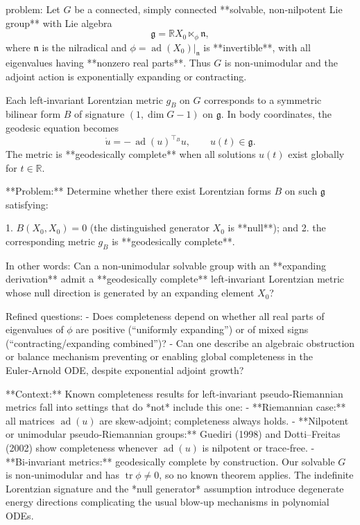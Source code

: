 problem:  
Let \(G\) be a connected, simply connected **solvable, non‑nilpotent Lie group** with Lie algebra  
\[
\mathfrak g = \mathbb R X_0 \ltimes_{\phi} \mathfrak n,
\]
where \(\mathfrak n\) is the nilradical and \(\phi=\operatorname{ad}(X_0)|_{\mathfrak n}\) is **invertible**, with all eigenvalues having **nonzero real parts**. Thus \(G\) is non‑unimodular and the adjoint action is exponentially expanding or contracting.  

Each left‑invariant Lorentzian metric \(g_B\) on \(G\) corresponds to a symmetric bilinear form \(B\) of signature \((1,\dim G-1)\) on \(\mathfrak g\). In body coordinates, the geodesic equation becomes  
\[
\dot u = -\,\operatorname{ad}(u)^{\top_B}u,\qquad u(t)\in\mathfrak g.
\]
The metric is **geodesically complete** when all solutions \(u(t)\) exist globally for \(t\in\mathbb R\).

**Problem:**  
Determine whether there exist Lorentzian forms \(B\) on such \(\mathfrak g\) satisfying:

1. \(B(X_0,X_0)=0\) (the distinguished generator \(X_0\) is **null**); and  
2. the corresponding metric \(g_B\) is **geodesically complete**.  

In other words:  
Can a non‑unimodular solvable group with an **expanding derivation** admit a **geodesically complete** left‑invariant Lorentzian metric whose null direction is generated by an expanding element \(X_0\)?  

Refined questions:  
- Does completeness depend on whether all real parts of eigenvalues of \(\phi\) are positive (“uniformly expanding”) or of mixed signs (“contracting/expanding combined”)?  
- Can one describe an algebraic obstruction or balance mechanism preventing or enabling global completeness in the Euler‑Arnold ODE, despite exponential adjoint growth?

**Context:**  
Known completeness results for left‑invariant pseudo‑Riemannian metrics fall into settings that do *not* include this one:  
- **Riemannian case:** all matrices \(\operatorname{ad}(u)\) are skew‑adjoint; completeness always holds.  
- **Nilpotent or unimodular pseudo‑Riemannian groups:** Guediri (1998) and Dotti–Freitas (2002) show completeness whenever \(\operatorname{ad}(u)\) is nilpotent or trace‑free.  
- **Bi‑invariant metrics:** geodesically complete by construction.  
Our solvable \(G\) is non‑unimodular and has \(\operatorname{tr}\phi\neq0\), so no known theorem applies. The indefinite Lorentzian signature and the *null generator* assumption introduce degenerate energy directions complicating the usual blow‑up mechanisms in polynomial ODEs.

